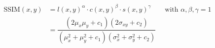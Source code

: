 \begin{align} \label{eq:ssim}
    \text{SSIM}(x, y) &= l(x,y)^\alpha \cdot c(x,y)^\beta \cdot s(x,y)^\gamma \qquad \text{with } \alpha, \beta, \gamma = 1 \\
    &= \dfrac{(2\mu_x \mu_y + c_1)(2\sigma_{xy} + c_2)}{(\mu_x^2 + \mu_y^2 + c_1)(\sigma_x^2 + \sigma_y^2 + c_2)}
\end{align}
